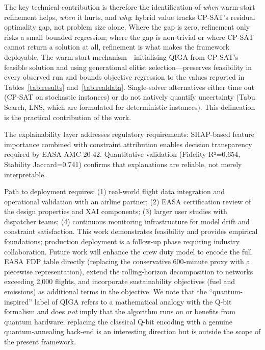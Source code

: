 \documentclass[12pt,number]{elsarticle}
\begin{document}
The key technical contribution is therefore the identification of \emph{when} warm-start refinement helps, \emph{when} it hurts, and \emph{why}: hybrid value tracks CP-SAT's residual optimality gap, not problem size alone. Where the gap is zero, refinement only risks a small bounded regression; where the gap is non-trivial or where CP-SAT cannot return a solution at all, refinement is what makes the framework deployable. The warm-start mechanism---initialising QIGA from CP-SAT's feasible solution and using generational elitist selection---preserves feasibility in every observed run and bounds objective regression to the values reported in Tables~\ref{tab:results} and~\ref{tab:realdata}. Single-solver alternatives either time out (CP-SAT on stochastic instances) or do not natively quantify uncertainty (Tabu Search, LNS, which are formulated for deterministic instances). This delineation is the practical contribution of the work.

The explainability layer addresses regulatory requirements: SHAP-based feature importance combined with constraint attribution enables decision transparency required by EASA AMC 20-42. Quantitative validation (Fidelity R²=0.654, Stability Jaccard=0.741) confirms that explanations are reliable, not merely interpretable.

Path to deployment requires: (1) real-world flight data integration and operational validation with an airline partner; (2) EASA certification review of the design properties and XAI components; (3) larger user studies with dispatcher teams; (4) continuous monitoring infrastructure for model drift and constraint satisfaction. This work demonstrates feasibility and provides empirical foundations; production deployment is a follow-up phase requiring industry collaboration. Future work will enhance the crew duty model to encode the full EASA FDP table directly (replacing the conservative 600-minute proxy with a piecewise representation), extend the rolling-horizon decomposition to networks exceeding 2{,}000 flights, and incorporate sustainability objectives (fuel and emissions) as additional terms in the objective. We note that the ``quantum-inspired'' label of QIGA refers to a mathematical analogy with the Q-bit formalism and does \emph{not} imply that the algorithm runs on or benefits from quantum hardware; replacing the classical Q-bit encoding with a genuine quantum-annealing back-end is an interesting direction but is outside the scope of the present framework.


\end{document}
